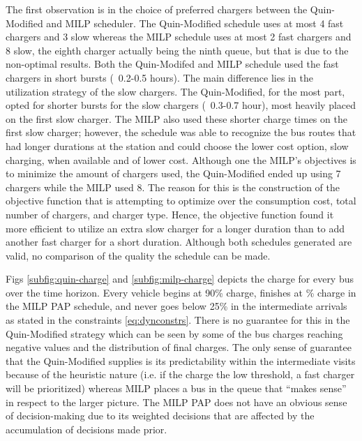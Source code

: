 \documentclass[utf8]{FrontiersinHarvard}
\newcommand{\bcharge}{0.7 }                                                     %
\newcommand{\mincharge}{25\% }                                                  %
\begin{document}
The first observation is in the choice of preferred chargers between the Quin-Modified and MILP scheduler. The
Quin-Modified schedule uses at most 4 fast chargers and 3 slow whereas the MILP schedule uses at most 2 fast chargers
and 8 slow, the eighth charger actually being the ninth queue, but that is due to the non-optimal results. Both the
Quin-Modifed and MILP schedule used the fast chargers in short bursts (~0.2-0.5 hours). The main difference lies in the
utilization strategy of the slow chargers. The Quin-Modified, for the most part, opted for shorter bursts for the slow
chargers (~0.3-0.7 hour), most heavily placed on the first slow charger. The MILP also used these shorter charge times
on the first slow charger; however, the schedule was able to recognize the bus routes that had longer durations at the
station and could choose the lower cost option, slow charging, when available and of lower cost. Although one the MILP's
objectives is to minimize the amount of chargers used, the Quin-Modified ended up using 7 chargers while the MILP used
8. The reason for this is the construction of the objective function that is attempting to optimize over the consumption
cost, total number of chargers, and charger type. Hence, the objective function found it more efficient to utilize an
extra slow charger for a longer duration than to add another fast charger for a short duration. Although both schedules
generated are valid, no comparison of the quality the schedule can be made.

Figs \ref{subfig:quin-charge} and \ref{subfig:milp-charge} depicts the charge for every bus over the time horizon. Every
vehicle begins at 90\% charge, finishes at \fpeval{\bcharge *100}\% charge in the MILP PAP schedule, and never goes
below \mincharge in the intermediate arrivals as stated in the constraints \eqref{eq:dynconstrs}. There is no guarantee
for this in the Quin-Modified strategy which can be seen by some of the bus charges reaching negative values and the
distribution of final charges. The only sense of guarantee that the Quin-Modified supplies is its predictability within
the intermediate visits because of the heuristic nature (i.e. if the charge the low threshold, a fast charger will be
prioritized) whereas MILP places a bus in the queue that ``makes sense'' in respect to the larger picture. The MILP PAP
does not have an obvious sense of decision-making due to its weighted decisions that are affected by the accumulation of
decisions made prior.
\end{document}
